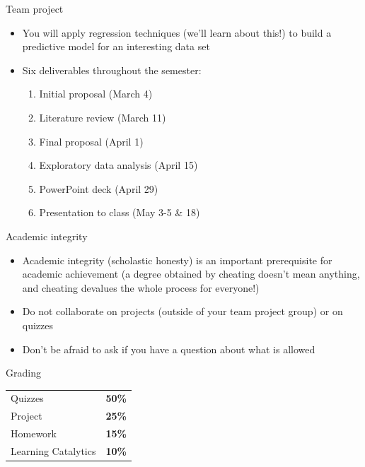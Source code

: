 \documentclass{beamer}\usepackage[]{graphicx}\usepackage[]{color}
\begin{document}
\begin{darkframes}
    \begin{frame}{Team project}
      \begin{itemize}
        \item You will apply regression techniques (we'll learn about this!) to build a predictive model for an interesting data set
        \item Six deliverables throughout the semester:
        \begin{enumerate}
          \item Initial proposal (March 4)
          \item Literature review (March 11)
          \item Final proposal (April 1)
          \item Exploratory data analysis (April 15)
          \item PowerPoint deck (April 29)
          \item Presentation to class (May 3-5 \& 18)
        \end{enumerate}
      \end{itemize}
    \end{frame}

    \begin{frame}{Academic integrity}
      \begin{itemize}
        \item Academic integrity (scholastic honesty) is an important prerequisite for academic achievement (a degree obtained by cheating doesn't mean anything, and cheating devalues the whole process for everyone!)
        \item Do not collaborate on projects (outside of your team project group) or on quizzes
        \item Don't be afraid to ask if you have a question about what is allowed
      \end{itemize}
    \end{frame}

    \begin{frame}{Grading}
      \begin{center}
        \begin{tabular}{ll}
          Quizzes             & \textbf{50\%} \\
          Project             & \textbf{25\%} \\
          Homework            & \textbf{15\%} \\
          Learning Catalytics & \textbf{10\%}  \\
        \end{tabular}
      \end{center}
    \end{frame}


\end{darkframes}
\end{document}

